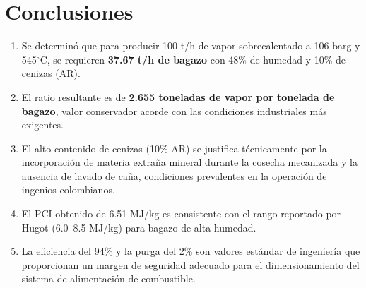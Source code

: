 \section{Conclusiones}

\begin{enumerate}
	\item Se determinó que para producir 100 t/h de vapor sobrecalentado a 106 barg y 545$^{\circ}$C, se requieren \textbf{37.67 t/h de bagazo} con 48\% de humedad y 10\% de cenizas (AR).
	\item El ratio resultante es de \textbf{2.655 toneladas de vapor por tonelada de bagazo}, valor conservador acorde con las condiciones industriales más exigentes.
	\item El alto contenido de cenizas (10\% AR) se justifica técnicamente por la incorporación de materia extraña mineral durante la cosecha mecanizada y la ausencia de lavado de caña, condiciones prevalentes en la operación de ingenios colombianos.
	\item El PCI obtenido de 6.51 MJ/kg es consistente con el rango reportado por Hugot (6.0--8.5 MJ/kg) para bagazo de alta humedad.
	\item La eficiencia del 94\% y la purga del 2\% son valores estándar de ingeniería que proporcionan un margen de seguridad adecuado para el dimensionamiento del sistema de alimentación de combustible.
\end{enumerate}
